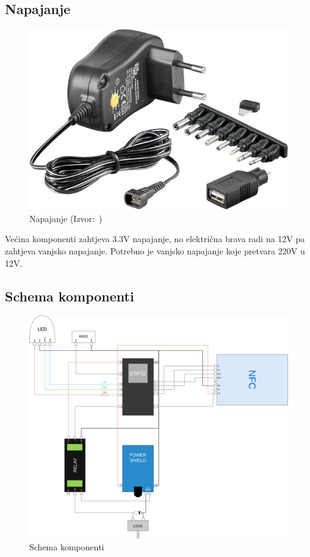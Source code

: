 \subsection{Napajanje}

\begin{figure}
    \centering
    \includegraphics[scale=0.4]{images/power-supply}
    \caption{Napajanje (Izvor:~\cite{chipoteka-power-supply})}
\end{figure}

Većina komponenti zahtjeva 3.3V napajanje, no električna brava radi na 12V pa zahtjeva vanjsko napajanje.
Potrebno je vanjsko napajanje koje pretvara 220V u 12V\@.

\clearpage

\subsection{Schema komponenti}

\begin{figure}[h!]
    \centering
    \includegraphics[width=\textwidth]{images/component-schema}
    \caption{Schema komponenti}
    \label{fig:component-schema}
\end{figure}

